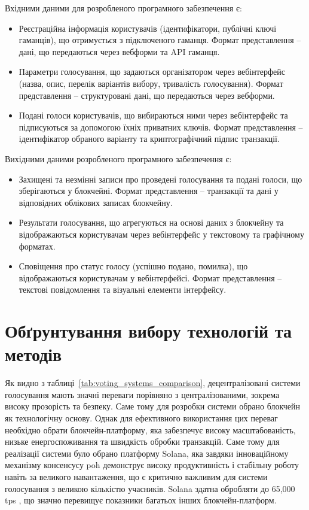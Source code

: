 \documentclass[14pt]{extreport}
\begin{document}
  Вхідними даними для розробленого програмного забезпечення є:
  
  \begin{itemize}
    \item Реєстраційна інформація користувачів (ідентифікатори, публічні ключі гаманців), що отримується з підключеного гаманця. Формат представлення – дані, що передаються через вебформи та API гаманця.
    \item Параметри голосування, що задаються організатором через вебінтерфейс (назва, опис, перелік варіантів вибору, тривалість голосування). Формат представлення – структуровані дані, що передаються через вебформи.
    \item Подані голоси користувачів, що вибираються ними через вебінтерфейс та підписуються за допомогою їхніх приватних ключів. Формат представлення – ідентифікатор обраного варіанту та криптографічний підпис транзакції.
  \end{itemize}
  
  Вихідними даними розробленого програмного забезпечення є:
  
  \begin{itemize}
    \item Захищені та незмінні записи про проведені голосування та подані голоси, що зберігаються у блокчейні. Формат представлення – транзакції та дані у відповідних облікових записах блокчейну.
    \item Результати голосування, що агрегуються на основі даних з блокчейну та відображаються користувачам через вебінтерфейс у текстовому та графічному форматах.
    \item Сповіщення про статус голосу (успішно подано, помилка), що відображаються користувачам у вебінтерфейсі. Формат представлення – текстові повідомлення та візуальні елементи інтерфейсу.
  \end{itemize}
  
  \section{Обґрунтування вибору технологій та методів}
  
  Як видно з таблиці~\ref{tab:voting_systems_comparison}, децентралізовані системи голосування мають значні переваги порівняно з централізованими, зокрема високу прозорість та безпеку. Саме тому для розробки системи обрано блокчейн як технологічну основу. Однак для ефективного використання цих переваг необхідно обрати блокчейн-платформу, яка забезпечує високу масштабованість, низьке енергоспоживання та швидкість обробки транзакцій. Саме тому для реалізації системи було обрано платформу Solana, яка завдяки інноваційному механізму консенсусу \gls{poh} демонструє високу продуктивність і стабільну роботу навіть за великого навантаження, що є критично важливим для системи голосування з великою кількістю учасників. Solana здатна обробляти до 65,000 \gls{tps} \cite{solana_report}, що значно перевищує показники багатьох інших блокчейн-платформ.
\end{document}
